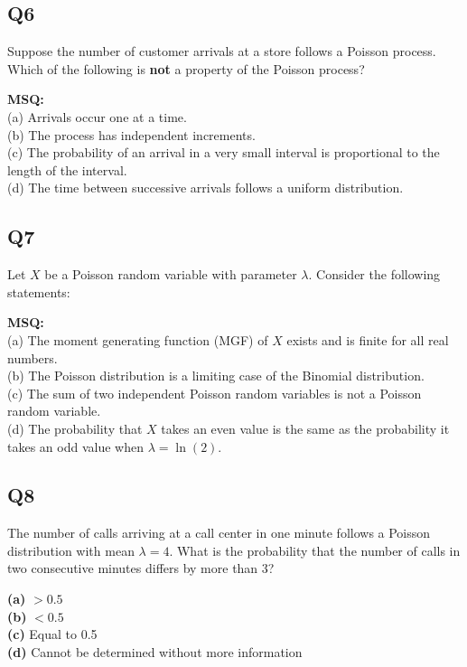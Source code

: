 \newpage
\subsection*{Q6}
Suppose the number of customer arrivals at a store follows a Poisson process. Which of the following is \textbf{not} a property of the Poisson process?

\textbf{MSQ:}  \\
(a) Arrivals occur one at a time.  \\
(b) The process has independent increments.  \\
(c) The probability of an arrival in a very small interval is proportional to the length of the interval.  \\
(d) The time between successive arrivals follows a uniform distribution.\\

\subsection*{Q7}
Let $X$ be a Poisson random variable with parameter $\lambda$. Consider the following statements:

\textbf{MSQ:}  \\
(a) The moment generating function (MGF) of $X$ exists and is finite for all real numbers. \\ 
(b) The Poisson distribution is a limiting case of the Binomial distribution. \\ 
(c) The sum of two independent Poisson random variables is not a Poisson random variable.  \\
(d) The probability that $X$ takes an even value is the same as the probability it takes an odd value when $\lambda = \ln(2)$.\\

\subsection*{Q8}
The number of calls arriving at a call center in one minute follows a Poisson distribution with mean $\lambda = 4$. What is the probability that the number of calls in two consecutive minutes differs by more than $3$?

\textbf{(a)} $>0.5$  \\
\textbf{(b)} $<0.5$  \\
\textbf{(c)} Equal to 0.5  \\
\textbf{(d)} Cannot be determined without more information

